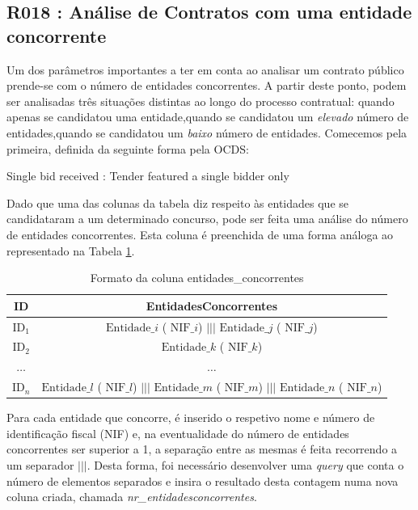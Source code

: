 \subsection{R018 : Análise de Contratos com uma entidade concorrente}

Um dos parâmetros importantes a ter em conta ao analisar um contrato público prende-se com o número de entidades concorrentes. A partir deste ponto, podem ser analisadas três situações distintas ao longo do processo contratual: 
quando apenas se candidatou uma entidade,quando se candidatou um \textit{elevado} número de entidades,quando se candidatou um \textit{baixo} número de entidades. Comecemos pela primeira, definida da seguinte forma pela OCDS:

\Lemma{}
{Single bid received : Tender featured a single bidder only }


Dado que uma das colunas da tabela diz respeito às entidades que se candidataram a um determinado concurso, pode ser feita uma análise do número de entidades concorrentes. Esta coluna é preenchida de uma forma análoga ao representado na Tabela \ref{tab:entsconc}. 


\begin{table}[H]
	\centering
	\begin{tabular}{|c|c|}
		\hline
		\textbf{ID}   & \textbf{EntidadesConcorrentes}                                                                                                      \\ \hline
		$\text{ID}_1$ & $\text{Entidade}\_i$ ( $\text{NIF}\_i$) $|||$ $\text{Entidade}\_j$ ( $\text{NIF}\_j$)                                               \\ \hline
		$\text{ID}_2$ & $\text{Entidade}\_k$ ( $\text{NIF}\_k$)                                                                                             \\ \hline
		$\dots$       & $\dots$                                                                                                                             \\ \hline
		$\text{ID}_n$ & $\text{Entidade}\_l$ ( $\text{NIF}\_l$) $|||$ $\text{Entidade}\_m$ ( $\text{NIF}\_m$) $|||$ $\text{Entidade}\_n$ ( $\text{NIF}\_n$) \\ \hline
	\end{tabular}
	\caption{Formato da coluna entidades\_concorrentes}
	\label{tab:entsconc}
\end{table}

Para cada entidade que concorre, é inserido o respetivo nome e número de identificação fiscal (NIF) e, na eventualidade do número de entidades concorrentes ser superior a 1, a separação entre as mesmas é feita recorrendo a um separador $|||$. Desta forma, foi necessário desenvolver uma \textit{query} que conta o número de elementos separados e insira o resultado desta contagem numa nova coluna criada, chamada \textit{nr\_entidadesconcorrentes}.


